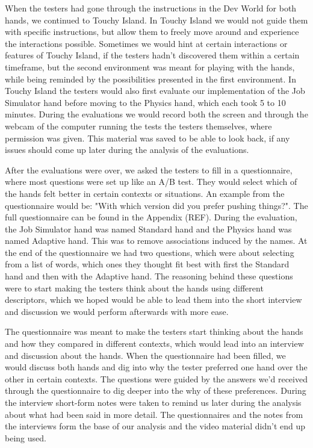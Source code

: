 When the testers had gone through the instructions in the Dev World for both hands, we continued to Touchy Island. In Touchy Island we would not guide them with specific instructions, but allow them to freely move around and experience the interactions possible. Sometimes we would hint at certain interactions or features of Touchy Island, if the testers hadn't discovered them within a certain timeframe, but the second environment was meant for playing with the hands, while being reminded by the possibilities presented in the first environment. In Touchy Island the testers would also first evaluate our implementation of the Job Simulator hand before moving to the Physics hand, which each took 5 to 10 minutes. During the evaluations we would record both the screen and through the webcam of the computer running the tests the testers themselves, where permission was given. This material was saved to be able to look back, if any issues should come up later during the analysis of the evaluations.

After the evaluations were over, we asked the testers to fill in a questionnaire, where most questions were set up like an A/B test. They would select which of the hands felt better in certain contexts or situations. An example from the questionnaire would be: "With which version did you prefer pushing things?". The full questionnaire can be found in the Appendix (REF). During the evaluation, the Job Simulator hand was named Standard hand and the Physics hand was named Adaptive hand. This was to remove associations induced by the names. At the end of the questionnaire we had two questions, which were about selecting from a list of words, which ones they thought fit best with first the Standard hand and then with the Adaptive hand. The reasoning behind these questions were to start making the testers think about the hands using different descriptors, which we hoped would be able to lead them into the short interview and discussion we would perform afterwards with more ease.

The questionnaire was meant to make the testers start thinking about the hands and how they compared in different contexts, which would lead into an interview and discussion about the hands. When the questionnaire had been filled, we would discuss both hands and dig into why the tester preferred one hand over the other in certain contexts. The questions were guided by the answers we'd received through the questionnaire to dig deeper into the why of these preferences. During the interview short-form notes were taken to remind us later during the analysis about what had been said in more detail. The questionnaires and the notes from the interviews form the base of our analysis and the video material didn't end up being used.

